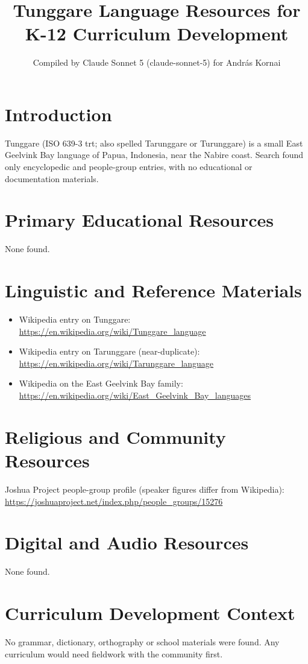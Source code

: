 \documentclass[12pt]{article}
\title{Tunggare Language Resources for K-12 Curriculum Development}
\author{Compiled by Claude Sonnet 5 (claude-sonnet-5) for Andr\'as Kornai}
\date{}
\begin{document}
\maketitle

\section{Introduction}
Tunggare (ISO 639-3 trt; also spelled Tarunggare or Turunggare) is a small East Geelvink Bay language of Papua, Indonesia, near the Nabire coast. Search found only encyclopedic and people-group entries, with no educational or documentation materials.

\section{Primary Educational Resources}
None found.

\section{Linguistic and Reference Materials}
\begin{itemize}
\item Wikipedia entry on Tunggare: \url{https://en.wikipedia.org/wiki/Tunggare_language}
\item Wikipedia entry on Tarunggare (near-duplicate): \url{https://en.wikipedia.org/wiki/Tarunggare_language}
\item Wikipedia on the East Geelvink Bay family: \url{https://en.wikipedia.org/wiki/East_Geelvink_Bay_languages}
\end{itemize}

\section{Religious and Community Resources}
Joshua Project people-group profile (speaker figures differ from Wikipedia): \url{https://joshuaproject.net/index.php/people_groups/15276}

\section{Digital and Audio Resources}
None found.

\section{Curriculum Development Context}
No grammar, dictionary, orthography or school materials were found. Any curriculum would need fieldwork with the community first.
\end{document}
